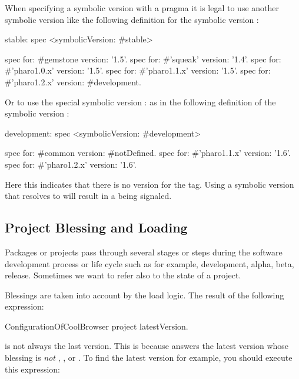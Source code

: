 \documentclass[a4paper,10pt,twoside]{book}
\begin{document}
When specifying a symbolic version with a  pragma it is legal to use another symbolic version like the following definition for the symbolic version :

\begin{code}{}
stable: spec
       <symbolicVersion: #stable>

       spec for: #gemstone version: '1.5'.
       spec for: #'squeak' version: '1.4'.
       spec for: #'pharo1.0.x' version: '1.5'.
       spec for: #'pharo1.1.x' version: '1.5'.
       spec for: #'pharo1.2.x' version: #development.
\end{code}

Or to use the special symbolic version : as in the following definition of the symbolic version :

\begin{code}{}
development: spec
       <symbolicVersion: #development>

       spec for: #common version: #notDefined.
       spec for: #'pharo1.1.x' version: '1.6'.
       spec for: #'pharo1.2.x' version: '1.6'.
\end{code}

Here this indicates that there is no version for the  tag. 
Using a symbolic version that resolves to  will result in a  being signaled.


\subsection{Project Blessing and Loading}
Packages or projects pass through several stages or steps during the software development process or life cycle such as for example, development, alpha, beta, release. Sometimes we want to refer also to the state of a project.

Blessings are taken into account by the load logic. The result of the following expression:
\begin{code}{}
ConfigurationOfCoolBrowser project latestVersion.
\end{code}
is not always the last version.  This is because  answers the latest version whose blessing is {\em not} , , or . To find the latest  version for example, you should execute this expression:
\end{document}
